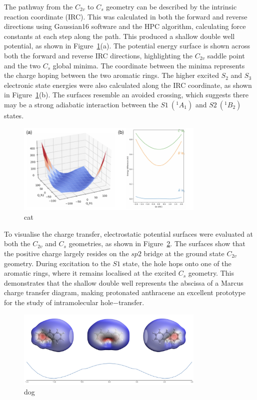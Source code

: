 \documentclass[journal=jpcafh,manuscript=article,layout=onecolumn, 12pt]{achemso}
\begin{document}
The pathway from the $C_{2v}$ to $C_s$ geometry can be described by the intrinsic reaction coordinate (IRC). This was calculated in both the forward and reverse directions using Gaussian16 software and the HPC algorithm, calculating force constants at each step along the path. This produced a shallow double well potential, as shown in Figure~\ref{Fig:2}(a). The potential energy surface is shown across both the forward and reverse IRC directions, highlighting the $C_{2v}$ saddle point and the two $C_s$ global minima. The coordinate between the minima represents the charge hoping between the two aromatic rings. The higher excited $S_2$ and $S_3$ electronic state energies were also calculated along the IRC coordinate, as shown in Figure~\ref{Fig:2}(b). The surfaces resemble an avoided crossing, which suggests there may be a strong adiabatic interaction between the $S1~(^1A_1)$ and $S2~(^1B_2)$ states.  

\begin{figure} [h]
	\includegraphics[width=0.8\textwidth]{figures/Figure2}
	\caption{cat}
	\label{Fig:2}
\end{figure}

To visualise the charge transfer, electrostatic potential surfaces were evaluated at both the $C_{2v}$ and $C_s$ geometries, as shown in Figure~\ref{Fig:3}. The surfaces show that the positive charge largely resides on the $sp2$ bridge at the ground state $C_{2v}$ geometry. During excitation to the $S1$ state, the hole hops onto one of the aromatic rings, where it remains localised at the excited $C_s$ geometry. This demonstrates that the shallow double well represents the abscissa of a Marcus charge transfer diagram, making protonated anthracene an excellent prototype for the study of intramolecular hole$-$transfer.

\begin{figure} [h]
	\includegraphics[width=0.8\textwidth]{figures/Fig3aa}
	\caption{dog}
	\label{Fig:3}
\end{figure}
\end{document}
